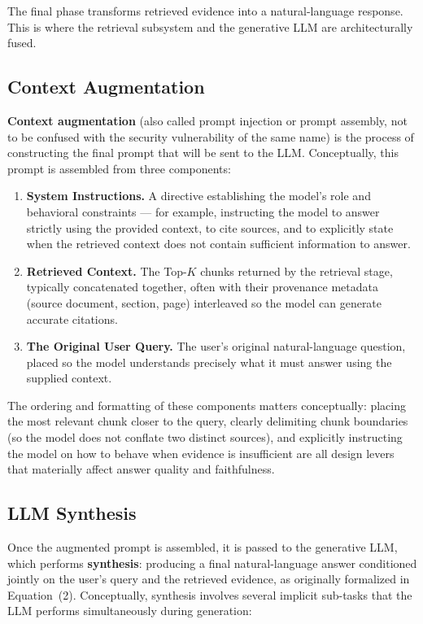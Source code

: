 \documentclass[11pt,a4paper]{article}
\begin{document}
The final phase transforms retrieved evidence into a natural-language response. This is where the retrieval subsystem and the generative LLM are architecturally fused.

\subsection{Context Augmentation}

\textbf{Context augmentation} (also called prompt injection or prompt assembly, not to be confused with the security vulnerability of the same name) is the process of constructing the final prompt that will be sent to the LLM. Conceptually, this prompt is assembled from three components:

\begin{enumerate}
  \item \textbf{System Instructions.} A directive establishing the model's role and behavioral constraints --- for example, instructing the model to answer strictly using the provided context, to cite sources, and to explicitly state when the retrieved context does not contain sufficient information to answer.
  \item \textbf{Retrieved Context.} The Top-$K$ chunks returned by the retrieval stage, typically concatenated together, often with their provenance metadata (source document, section, page) interleaved so the model can generate accurate citations.
  \item \textbf{The Original User Query.} The user's original natural-language question, placed so the model understands precisely what it must answer using the supplied context.
  \end{enumerate}

The ordering and formatting of these components matters conceptually: placing the most relevant chunk closer to the query, clearly delimiting chunk boundaries (so the model does not conflate two distinct sources), and explicitly instructing the model on how to behave when evidence is insufficient are all design levers that materially affect answer quality and faithfulness.

\subsection{LLM Synthesis}

Once the augmented prompt is assembled, it is passed to the generative LLM, which performs \textbf{synthesis}: producing a final natural-language answer conditioned jointly on the user's query and the retrieved evidence, as originally formalized in Equation~(2). Conceptually, synthesis involves several implicit sub-tasks that the LLM performs simultaneously during generation:
\end{document}
